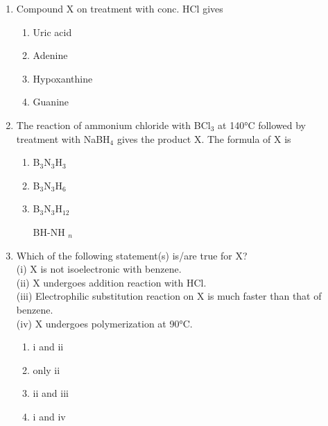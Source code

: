 \documentclass[journal,12pt,onecolumn]{IEEEtran}
\theoremstyle{remark}
\begin{document}
\begin{enumerate}
\item  Compound X on treatment with conc. HCl gives \hfill{}
\begin{multicols}{2}
\begin{enumerate}
    \item Uric acid
    \item Adenine
    \item Hypoxanthine
    \item Guanine
\end{enumerate}
\end{multicols}
 

\item  The reaction of ammonium chloride with BCl$_3$ at 140°C followed by treatment with NaBH$_4$ gives the product X. The formula of X is \hfill{}
\begin{multicols}{2}
\begin{enumerate}
    \item B$_3$N$_3$H$_3$
    \item B$_3$N$_3$H$_6$
    \item B$_3$N$_3$H$_{12}$
     \item   [BH-NH]$_n$
\end{enumerate}
\end{multicols}


\item  Which of the following statement(s) is/are true for X?\hfill{}\\
(i) X is not isoelectronic with benzene.\\
(ii) X undergoes addition reaction with HCl.\\
(iii) Electrophilic substitution reaction on X is much faster than that of benzene.\\
(iv) X undergoes polymerization at 90°C. \hfill{}
\begin{multicols}{2}
\begin{enumerate}
    \item i and ii
    \item only ii
    \item ii and iii
    \item i and iv
\end{enumerate}
\end{multicols}



\end{enumerate}
\end{document}

